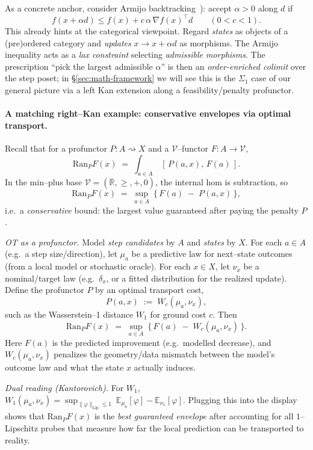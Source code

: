 \documentclass[11pt]{article}
\numberwithin{equation}{section}
\theoremstyle{upright}
\newcommand{\V}{\mathcal{V}}
\newcommand{\Ran}{\mathrm{Ran}}
\newcommand{\profto}{\rightsquigarrow}
\begin{document}
As a concrete anchor, consider Armijo backtracking~\cite{NocedalWright2006}): accept $\alpha>0$ along $d$ if
\[
f(x+\alpha d) \le f(x)+c\,\alpha\,\nabla f(x)^\top d \qquad (0<c<1).
\]
This already hints at the categorical viewpoint. Regard \emph{states} as objects of a (pre)ordered category and \emph{updates} $x\to x+\alpha d$ as morphisms. The Armijo inequality acts as a \emph{lax constraint} selecting \emph{admissible morphisms}. The prescription \enquote{pick the largest admissible $\alpha$} is then an \emph{order-enriched colimit} over the step poset; in \S\ref{sec:math-framework} we will see this is the $\Sigma_1$ case of our general picture via a left Kan extension along a feasibility/penalty profunctor.

\paragraph{A matching right--Kan example: conservative envelopes via optimal transport.}
Recall that for a profunctor $P:A\profto X$ and a $\V$--functor $F:A\to\V$,
\[
\Ran_{P}F(x)\;=\;\int_{a\in A}\,[\,P(a,x),\,F(a)\,].
\]
In the min--plus base $\V=(\overline{\mathbb R},\ge,+,0)$, the internal hom is subtraction, so
\[
\Ran_{P}F(x)\;=\;\sup_{a\in A}\ \big\{\,F(a)\;-\;P(a,x)\,\big\},
\]
i.e.\ a \emph{conservative} bound: the largest value guaranteed after paying the penalty $P$.

\medskip
\noindent\emph{OT as a profunctor.}
Model \emph{step candidates} by $A$ and \emph{states} by $X$. For each $a\in A$ (e.g.\ a step size/direction), let $\mu_a$ be a predictive law for next--state outcomes (from a local model or stochastic oracle). For each $x\in X$, let $\nu_x$ be a nominal/target law (e.g.\ $\delta_{x}$, or a fitted distribution for the realized update). Define the profunctor $P$ by an optimal transport cost,
\[
P(a,x)\;:=\;W_c(\mu_a,\nu_x),
\]
such as the Wasserstein--1 distance $W_1$ for ground cost $c$. Then
\[
\boxed{\quad
\Ran_{P}F(x)\;=\;\sup_{a\in A}\ \Big\{\,F(a)\;-\;W_c(\mu_a,\nu_x)\,\Big\}.
\quad}
\]
Here $F(a)$ is the predicted improvement (e.g.\ modelled decrease), and $W_c(\mu_a,\nu_x)$ penalizes the geometry/data mismatch between the model’s outcome law and what the state $x$ actually induces.

\medskip
\noindent\emph{Dual reading (Kantorovich).}
For $W_1$, $W_1(\mu_a,\nu_x)=\sup_{\|\varphi\|_{\mathrm{Lip}}\le 1}\ \mathbb E_{\mu_a}[\varphi]-\mathbb E_{\nu_x}[\varphi]$. Plugging this into the display shows that $\Ran_{P}F(x)$ is the \emph{best guaranteed envelope} after accounting for all $1$--Lipschitz probes that measure how far the local prediction can be transported to reality.
\end{document}
